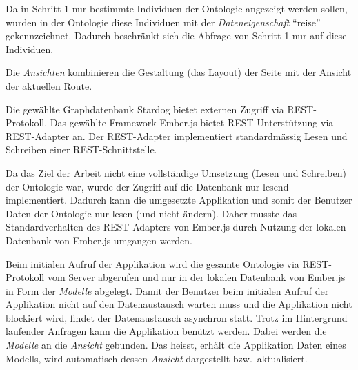 Da in Schritt 1 nur bestimmte Individuen der Ontologie angezeigt werden sollen, wurden in der Ontologie diese Individuen mit der \textit{Dateneigenschaft} ``reise'' gekennzeichnet. Dadurch beschränkt sich die Abfrage von Schritt 1 nur auf diese Individuen.

Die \textit{Ansichten} kombinieren die Gestaltung (das Layout) der Seite mit der Ansicht der aktuellen Route.

Die gewählte Graphdatenbank Stardog bietet externen Zugriff via REST-Protokoll. Das gewählte Framework Ember.js bietet REST-Unterstützung via REST-Adapter an. Der REST-Adapter implementiert standardmässig Lesen und Schreiben einer REST-Schnittstelle.

Da das Ziel der Arbeit nicht eine vollständige Umsetzung (Lesen und Schreiben) der Ontologie war, wurde der Zugriff auf die Datenbank nur lesend implementiert. Dadurch kann die umgesetzte Applikation und somit der Benutzer Daten der Ontologie nur lesen (und nicht ändern). Daher musste das Standardverhalten des REST-Adapters von Ember.js durch Nutzung der lokalen Datenbank von Ember.js umgangen werden.

Beim initialen Aufruf der Applikation wird die gesamte Ontologie via REST-Protokoll vom Server abgerufen und nur in der lokalen Datenbank von Ember.js in Form der \textit{Modelle} abgelegt. Damit der Benutzer beim initialen Aufruf der Applikation nicht auf den Datenaustausch warten muss und die Applikation nicht blockiert wird, findet der Datenaustausch asynchron statt. Trotz im  Hintergrund laufender Anfragen kann die Applikation benützt werden. Dabei werden die \textit{Modelle} an die \textit{Ansicht} gebunden. Das heisst, erhält die Applikation Daten eines Modells, wird automatisch dessen \textit{Ansicht} dargestellt bzw.\ aktualisiert.
